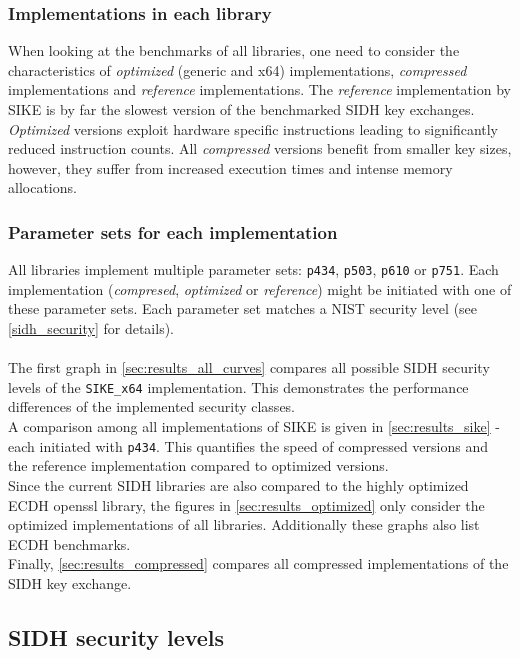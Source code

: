 \subsubsection{Implementations in each library}
When looking at the benchmarks of all libraries, one need to consider the characteristics of \textit{optimized} (generic and x64) implementations, \textit{compressed} implementations and \textit{reference} implementations. The \textit{reference} implementation by SIKE is by far the slowest version of the benchmarked SIDH key exchanges. \textit{Optimized} versions exploit hardware specific instructions leading to significantly reduced instruction counts. All \textit{compressed} versions benefit from smaller key sizes, however, they suffer from increased execution times and intense memory allocations. 
\subsubsection{Parameter sets for each implementation}
All libraries implement multiple parameter sets: \texttt{p434}, \texttt{p503}, \texttt{p610} or \texttt{p751}. Each implementation (\textit{compresed}, \textit{optimized} or \textit{reference}) might be initiated with one of these parameter sets. Each parameter set matches a NIST security level (see \autoref{sidh_security} for details).
\\\\
The first graph in \autoref{sec:results_all_curves} compares all possible SIDH security levels of the \texttt{SIKE\_x64} implementation. This demonstrates the performance differences of the implemented security classes. \\
A comparison among all implementations of SIKE is given in \autoref{sec:results_sike} - each initiated with \texttt{p434}. This quantifies the speed of compressed versions and the reference implementation compared to optimized versions.\\ 
Since the current SIDH libraries are also compared to the highly optimized ECDH openssl library, the figures in \autoref{sec:results_optimized} only consider the optimized implementations of all libraries. Additionally these graphs also list ECDH benchmarks. \\
Finally, \autoref{sec:results_compressed} compares all compressed implementations of the SIDH key exchange.\newpage

\subsection{SIDH security levels}\label{sec:results_all_curves}

